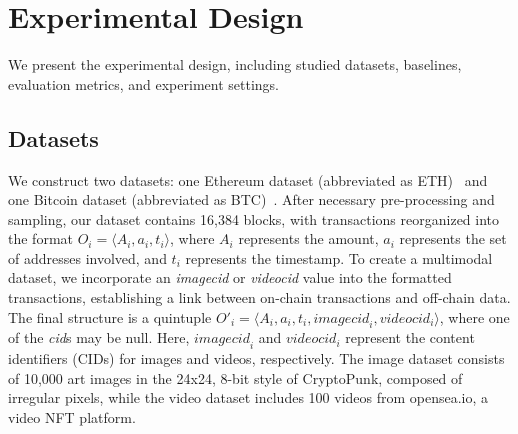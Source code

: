 \section{Experimental Design}


We present the experimental design, including studied datasets, baselines, evaluation metrics, and experiment settings.


\subsection{Datasets}
\label{sec:dataset}


We construct two datasets: one Ethereum dataset (abbreviated as ETH)~\cite{awesomeBigquery2022} and one Bitcoin dataset (abbreviated as BTC)~\cite{vanclassifying}. 
After necessary pre-processing and sampling, our dataset contains 16,384 blocks, with transactions reorganized into the format \( O_i = \langle A_i, a_i, t_i \rangle \), where \( A_i \) represents the amount, \( a_i \) represents the set of addresses involved, and \( t_i \) represents the timestamp.
To create a multimodal dataset, we incorporate an \textit{imagecid} or \textit{videocid} value into the formatted transactions, establishing a link between on-chain transactions and off-chain data. 
The final structure is a quintuple \( O'_i = \langle A_i, a_i, t_i, \textit{imagecid}_i, \textit{videocid}_i \rangle \), where one of the \textit{cid}s may be null. Here, \(\textit{imagecid}_i\) and \(\textit{videocid}_i\) represent the content identifiers (CIDs) for images and videos, respectively. 
The image dataset consists of 10,000 art images in the 24x24, 8-bit style of CryptoPunk, composed of irregular pixels, while the video dataset includes 100 videos from opensea.io, a video NFT platform.


